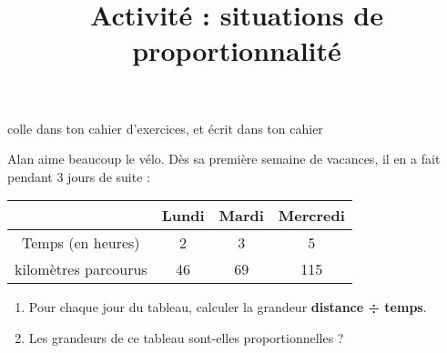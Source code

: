 \documentclass[a4paper,11pt]{article}
\title{Activité : situations de proportionnalité}
\date{}
\author{}
\makeatletter
\renewcommand{\maketitle}{%
{\scriptsize colle dans ton cahier d'exercices, et écrit dans ton cahier} \vspace{0.5em}

	\begin{center}
		\LARGE
		\myuline{\@title}
		\vspace{2em}
	\end{center}
}
\makeatother
\begin{document}
\maketitle

\begin{exercice}
	Alan aime beaucoup le vélo. Dès sa première semaine de vacances, il en a fait pendant 3 jours de suite :

	\begin{tabular}{|c|c|c|c|}
		\hline
		                                           & \cellcolor{lightgray} Lundi & \cellcolor{lightgray} Mardi & \cellcolor{lightgray} Mercredi \\ \hline
		\cellcolor{lightgray} Temps (en heures)    & 2                           & 3                           & 5                              \\ \hline
		\cellcolor{lightgray} kilomètres parcourus & 46                          & 69                          & 115                            \\ \hline
	\end{tabular}
	\begin{enumerate}
		\item Pour chaque jour du tableau, calculer la grandeur \textbf{distance ÷ temps}.
		\item Les grandeurs de ce tableau sont-elles proportionnelles ?
	\end{enumerate}
\end{exercice}

\vspace{1.5em}
\end{document}
